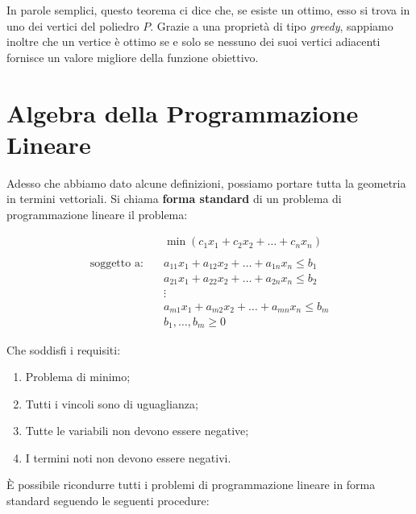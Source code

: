 \vspace{1em}

In parole semplici, questo teorema ci dice che, se esiste un ottimo, esso si trova in uno dei vertici del poliedro \( P \).  
Grazie a una proprietà di tipo \textit{greedy}, sappiamo inoltre che un vertice è ottimo se e solo se nessuno dei suoi vertici adiacenti fornisce un valore migliore della funzione obiettivo.


\section{Algebra della Programmazione Lineare}

Adesso che abbiamo dato alcune definizioni, possiamo portare tutta la geometria in termini vettoriali.  
Si chiama \textbf{forma standard} di un problema di programmazione lineare il problema:

\[
\begin{aligned}
&\min(c_1x_1 + c_2x_2 + \ldots + c_nx_n) \\
\\
\text{soggetto a:} \quad 
&a_{11}x_1 + a_{12}x_2 + \ldots + a_{1n}x_n \leq b_1 \\
&a_{21}x_1 + a_{22}x_2 + \ldots + a_{2n}x_n \leq b_2 \\
&\vdots \\
&a_{m1}x_1 + a_{m2}x_2 + \ldots + a_{mn}x_n \leq b_m \\
&b_1, \ldots, b_m \geq 0
\end{aligned}
\]

Che soddisfi i requisiti:
\begin{enumerate}
    \item Problema di minimo;
    \item Tutti i vincoli sono di uguaglianza;
    \item Tutte le variabili non devono essere negative;
    \item I termini noti non devono essere negativi.
\end{enumerate}


È possibile ricondurre tutti i problemi di programmazione lineare in forma standard seguendo le seguenti procedure:

